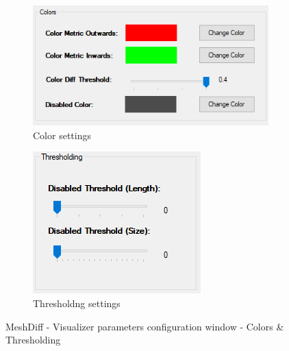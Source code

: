 \begin{figure}[h]
	\centering
	\begin{subfigure}{0.6\textwidth}
		\includegraphics[width=\textwidth]{./img/meshdiff-visualizer_parameters-colors.PNG}
		\caption{Color settings}
		\label{fig:meshdiff-visualizer_parameters_colors}
	\end{subfigure}
	\qquad
	\begin{subfigure}{0.3\textwidth}
		\includegraphics[width=\textwidth]{./img/meshdiff-visualizer_parameters-thresholding.PNG}
		\caption{Thresholdng settings}
		\label{fig:meshdiff-visualizer_parameters_thresholding}
	\end{subfigure}
	\caption[MeshDiff - Visualizer parameters - Colors \& Thresholding]{MeshDiff - Visualizer parameters configuration window - Colors \& Thresholding}
\end{figure}

